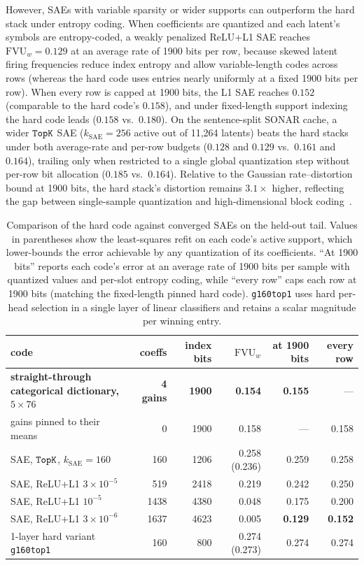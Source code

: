 However, SAEs with variable sparsity or wider supports can outperform the
hard stack under entropy coding. When coefficients are quantized and each
latent's symbols are entropy-coded, a weakly penalized ReLU+L1 SAE
reaches $\mathrm{FVU}_w = 0.129$ at an average rate of 1900 bits per
row, because skewed latent firing frequencies reduce index entropy and
allow variable-length codes across rows (whereas the hard code uses
entries nearly uniformly at a fixed 1900 bits per row). When every row is
capped at 1900 bits, the L1 SAE reaches $0.152$ (comparable to the hard
code's $0.158$), and under fixed-length support indexing the hard code
leads ($0.158$ vs.\ $0.180$). On the sentence-split SONAR cache, a wider
$\mathop{\mathtt{TopK}}\limits$ SAE ($k_{\mathrm{SAE}}{=}256$ active out of 11{,}264 latents)
beats the hard stacks under both average-rate and per-row budgets
($0.128$ and $0.129$ vs.\ $0.161$ and $0.164$), trailing only when restricted
to a single global quantization step without per-row bit allocation
($0.185$ vs.\ $0.164$). Relative to the Gaussian rate--distortion bound
at 1900 bits, the hard stack's distortion remains $3.1\times$ higher,
reflecting the gap between single-sample quantization and high-dimensional
block coding~\cite{cover2006}.

\begin{table}[tp]\centering\small\setlength{\tabcolsep}{4pt}
\begin{tabular}{@{}lrrrrr@{}}
\toprule
code & coeffs & index bits & $\mathrm{FVU}_w$ & at 1900 bits & every row \\
\midrule
\textbf{straight-through categorical dictionary, $5\times76$} & \textbf{4 gains} & \textbf{1900} & \textbf{0.154} & \textbf{0.155} & --- \\
\quad gains pinned to their means & 0 & 1900 & 0.158 & --- & 0.158 \\
SAE, $\mathop{\mathtt{TopK}}\limits$, $k_{\mathrm{SAE}}{=}160$ & 160 & 1206 & 0.258 (0.236) & 0.259 & 0.258 \\
SAE, ReLU+L1 $3\times10^{-5}$ & 519 & 2418 & 0.219 & 0.242 & 0.250 \\
SAE, ReLU+L1 $10^{-5}$ & 1438 & 4380 & 0.048 & 0.175 & 0.200 \\
SAE, ReLU+L1 $3\times10^{-6}$ & 1637 & 4623 & 0.005 & \textbf{0.129} & \textbf{0.152} \\
1-layer hard variant \texttt{g160top1} & 160 & 800 & 0.274 (0.273) & 0.274 & 0.274 \\
\bottomrule
\end{tabular}
\caption{Comparison of the hard code against converged SAEs on the
held-out tail. Values in parentheses show the least-squares refit on each
code's active support, which lower-bounds the error achievable by any
quantization of its coefficients. ``At 1900 bits'' reports each code's
error at an average rate of 1900 bits per sample with quantized values
and per-slot entropy coding, while ``every row'' caps each row at 1900
bits (matching the fixed-length pinned hard code). \texttt{g160top1} uses
hard per-head selection in a single layer of linear classifiers and
retains a scalar magnitude per winning entry.}
\label{tab:prelim-ste}
\end{table}

